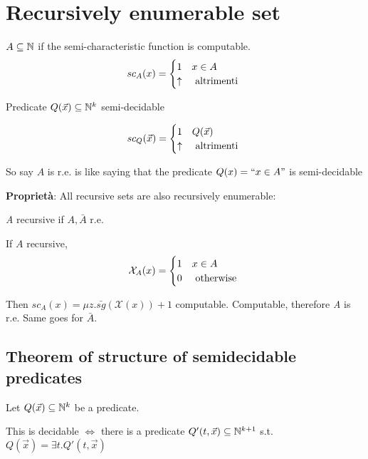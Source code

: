 \chapter {Recursively enumerable set}

$ A \subseteq \mathbb{N} $ if the semi-characteristic function is computable.
\begin{equation*}
  sc_A(x) = \begin{cases}
    1        & x \in A        \\
    \uparrow & $ altrimenti $
  \end{cases}
\end{equation*}

Predicate $ Q(\vec{x}) \subseteq \mathbb{N}^k $ semi-decidable

\begin{equation*}
  sc_Q(\vec{x}) = \begin{cases}
    1        & Q(\vec{x})     \\
    \uparrow & $ altrimenti $
  \end{cases}
\end{equation*}

So say $A$ is r.e. is like saying that the predicate $ Q(x)=``x \in A" $ is semi-decidable

\textbf{Proprietà}: All recursive sets are also recursively enumerable:

\textit{A} recursive if $ A, \bar{A} $ r.e.

If $A$ recursive, \begin{equation*}
  \mathcal{X}_A(x)=\begin{cases}
    1 & x\in A        \\
    0 & $ otherwise $
  \end{cases}
\end{equation*}

Then $ sc_A(x) = \mu z.\bar{sg}(\mathcal{X}(x)) + 1 $ computable. Computable, therefore \textit{A} is r.e. Same goes for $ \bar{A} $.

\section {Theorem of structure of semidecidable predicates}

Let $ Q(\vec{x}) \subseteq \mathbb{N}^k $ be a predicate.

This is decidable $ \Leftrightarrow $ there is a predicate $ Q'(t,\vec{x}) \subseteq \mathbb{N}^{k+1} $ s.t. $ Q(\vec{x}) = \exists t. Q'(t,\vec{x}) $

